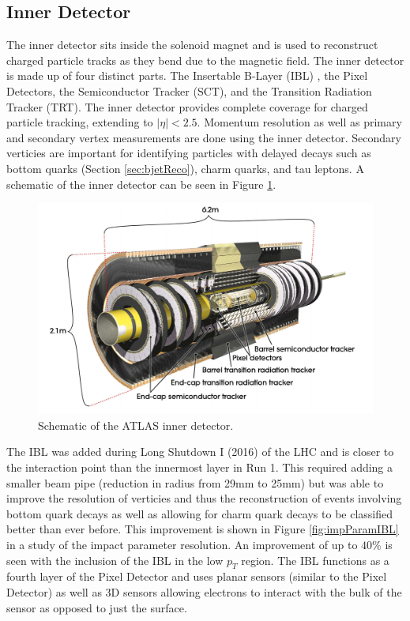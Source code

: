 \subsection{Inner Detector}
\label{sec:InnerDet}
The inner detector sits inside the solenoid magnet and is used to reconstruct charged particle tracks as they bend due to the magnetic field.  The inner detector is made up of four distinct parts.  The Insertable B-Layer (IBL) \cite{Capeans:1291633}, the Pixel Detectors, the Semiconductor Tracker (SCT), and the Transition Radiation Tracker (TRT)\cite{CERN-LHCC-97-016}.  The inner detector provides complete coverage for charged particle tracking, extending to $|\eta|<2.5$.  Momentum resolution as well as primary and secondary vertex measurements are done using the inner detector.  Secondary verticies are important for identifying particles with delayed decays such as bottom quarks (Section \ref{sec:bjetReco}), charm quarks, and tau leptons. A schematic of the inner detector can be seen in Figure \ref{fig:ATLASInnerDet}.

\begin{figure}[ht!]
	\centering
	\includegraphics[width=0.8\columnwidth]{../ThesisImages/LHCImages/ATLASInnerDetector.png}
	\caption[Schematic of the ATLAS inner detector.]{Schematic of the ATLAS inner detector\cite{ATLAS}.
	}
	\label{fig:ATLASInnerDet}
\end{figure}

The IBL was added during Long Shutdown I (2016) of the LHC and is closer to the interaction point than the innermost layer in Run 1.  This required adding a smaller beam pipe (reduction in radius from 29mm to 25mm) but was able to improve the resolution of verticies and thus the reconstruction of events involving bottom quark decays as well as allowing for charm quark decays to be classified better than ever before.  This improvement is shown in Figure \ref{fig:impParamIBL} in a study of the impact parameter resolution.  An improvement of up to $40\%$ is seen with the inclusion of the IBL in the low $p_T$ region.  The IBL functions as a fourth layer of the Pixel Detector and uses planar sensors (similar to the Pixel Detector) as well as 3D sensors allowing electrons to interact with the bulk of the sensor as opposed to just the surface. 

